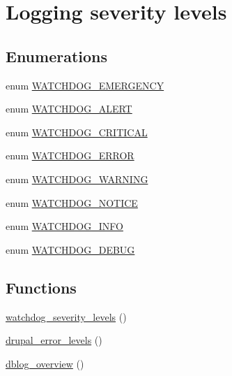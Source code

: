\hypertarget{group__logging__severity__levels}{
\section{Logging severity levels}
\label{group__logging__severity__levels}
}
\subsection*{Enumerations}
\begin{DoxyCompactItemize}
\item 
enum \hyperlink{group__logging__severity__levels_ga467e941228edf3b033b5ef460e1bfcf7}{WATCHDOG\_\-EMERGENCY} 
\item 
enum \hyperlink{group__logging__severity__levels_ga9fdd40d55b14109f09f091f401f237c0}{WATCHDOG\_\-ALERT} 
\item 
enum \hyperlink{group__logging__severity__levels_gab4129b98c8480bea3cbcd62083ae81e3}{WATCHDOG\_\-CRITICAL} 
\item 
enum \hyperlink{group__logging__severity__levels_ga174c9df2936096e11986fcf184d48576}{WATCHDOG\_\-ERROR} 
\item 
enum \hyperlink{group__logging__severity__levels_ga5361f835e10b39b553ee73c1b9414bf1}{WATCHDOG\_\-WARNING} 
\item 
enum \hyperlink{group__logging__severity__levels_ga757a33416683e8c44636a8799f60b477}{WATCHDOG\_\-NOTICE} 
\item 
enum \hyperlink{group__logging__severity__levels_ga9629ff808fd20ce4abb297db5976af4d}{WATCHDOG\_\-INFO} 
\item 
enum \hyperlink{group__logging__severity__levels_gaf672cd38d5654f8a4a12e32d9b9e749d}{WATCHDOG\_\-DEBUG} 
\end{DoxyCompactItemize}
\subsection*{Functions}
\begin{DoxyCompactItemize}
\item 
\hyperlink{group__logging__severity__levels_gafb5d4b58ec7e483153644c0f664e0ca4}{watchdog\_\-severity\_\-levels} ()
\item 
\hyperlink{group__logging__severity__levels_gaa3c430d607b6666eb39e5df2937f0f03}{drupal\_\-error\_\-levels} ()
\item 
\hyperlink{group__logging__severity__levels_ga3b74d083df84c683ed01c7a5468eee12}{dblog\_\-overview} ()
\end{DoxyCompactItemize}


